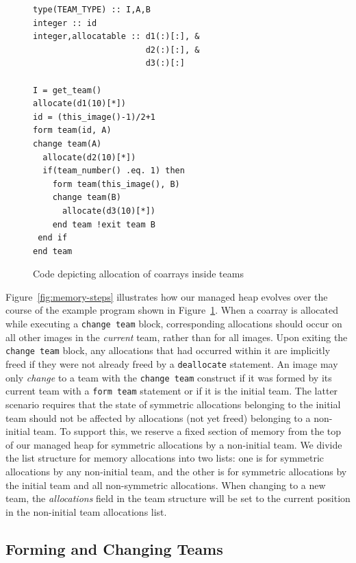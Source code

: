 \begin{figure}[H]
    \begin{minipage}{0.4\columnwidth}
    \begin{lstlisting}
type(TEAM_TYPE) :: I,A,B
integer :: id
integer,allocatable :: d1(:)[:], &
                       d2(:)[:], &
                       d3(:)[:]

I = get_team()
allocate(d1(10)[*])
id = (this_image()-1)/2+1
form team(id, A)
change team(A)
  allocate(d2(10)[*])
  if(team_number() .eq. 1) then
    form team(this_image(), B)
    change team(B)
      allocate(d3(10)[*])
    end team !exit team B
 end if
end team

\end{lstlisting}
\end{minipage}
\caption{Code depicting allocation of coarrays inside teams}
\label{fig:demo-code}
\end{figure}




Figure~\ref{fig:memory-steps} illustrates how our managed heap
evolves over the course of the example program shown in Figure~\ref{fig:demo-code}.
When a coarray is allocated while executing a \texttt{change~team} block, corresponding
allocations should occur on all other images in the \textit{current} team,
rather than for all images.  Upon exiting the \texttt{change~team} block, any
allocations that had occurred within it are implicitly freed if they were not
already freed by a \texttt{deallocate} statement. An image may only
\textit{change} to a team with the \texttt{change team} construct if it was
formed by its current team with a \texttt{form team} statement or if it is the
initial team. The latter scenario requires that the state of symmetric
allocations belonging to the initial team should not be affected by
allocations (not yet freed) belonging to a non-initial team. To support this,
we reserve a fixed section of memory from the top of our managed heap for
symmetric allocations by a non-initial team. 
We divide the list structure for memory allocations into two lists: one is
for symmetric allocations by any non-initial team, and the other is for
symmetric allocations by the initial team and all non-symmetric allocations.
When changing to a new team, the \textit{allocations} field in the team
structure will be set to the current position in the non-initial team
allocations list.

\subsection{Forming and Changing Teams}

